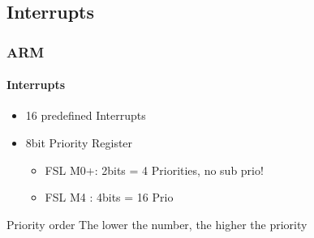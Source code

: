 \subsection{Interrupts}
\begin{frame}
    \frametitle{ARM}
    \framesubtitle{Interrupts}
        \begin{itemize}
        \item 16 predefined Interrupts
        \item 8bit Priority Register
      		  \begin{itemize}
      		  \item FSL M0+: 2bits = 4 Priorities, no sub prio!
       		 \item FSL M4 : 4bits = 16 Prio
    		\end{itemize}
        \end{itemize}
    \begin{block}{Priority order}
        The lower the number, the higher the priority
    \end{block}
\end{frame}
